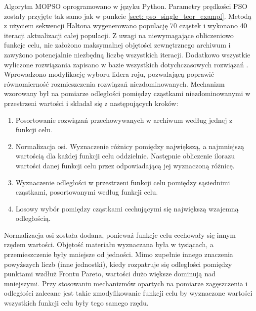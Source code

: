 Algorytm MOPSO oprogramowano w języku Python. Parametry prędkości PSO zostały przyjęte tak samo jak w punkcie \ref{sect: pso_single_teor_exampl}. Metodą z użyciem sekwencji Haltona wygenerowano populację 70 cząstek i wykonano 40 iteracji aktualizacji całej populacji. Z uwagi na niewymagające obliczeniowo funkcje celu, nie założono maksymalnej objętości zewnętrznego archiwum i zawyżono potencjalnie niezbędną liczbę wszystkich iteracji. Dodatkowo wszystkie wyliczone rozwiązania zapisano w bazie wszystkich dotychczasowych rozwiązań . Wprowadzono modyfikację wyboru lidera roju, pozwalającą poprawić równomierność rozmieszczenia rozwiązań niezdominowanych. Mechanizm wzorowany był na pomiarze odległości pomiędzy cząstkami niezdominowanymi w przestrzeni wartości \parencite{Deb2002} i składał się z następujących kroków:
\begin{enumerate}
	\item Posortowanie rozwiązań przechowywanych w archiwum według jednej z funkcji celu.
	\item Normalizacja osi. Wyznaczenie różnicy pomiędzy największą, a najmniejszą wartością dla każdej funkcji celu oddzielnie. Następnie obliczenie ilorazu wartości danej funkcji celu przez odpowiadającą jej wyznaczoną różnicę.
	\item Wyznaczenie odległości w przestrzeni funkcji celu pomiędzy sąsiednimi cząstkami, posortowanymi według funkcji celu.
	\item Losowy wybór pomiędzy cząstkami cechującymi się największą wzajemną odległością.
\end{enumerate}
Normalizacja osi została dodana, ponieważ funkcje celu cechowały się innym rzędem wartości. Objętość materiału wyznaczana była w tysiącach, a przemieszczenie były mniejsze od jedności. Mimo zupełnie innego znaczenia powyższych liczb (inne jednostki), kiedy rozpatruje się odległości pomiędzy punktami wzdłuż Frontu Pareto, wartości dużo większe dominują nad mniejszymi. Przy stosowaniu mechanizmów opartych na pomiarze zagęszczenia i odległości zalecane jest takie zmodyfikowanie funkcji celu by wyznaczone wartości wszystkich funkcji celu były tego samego rzędu.

